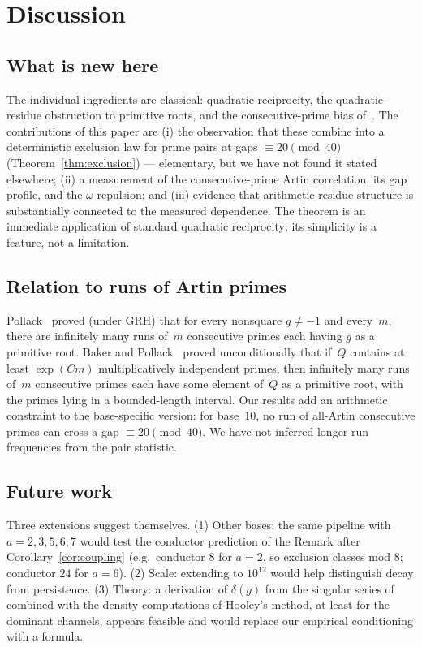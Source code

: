\documentclass[11pt]{amsart}
\theoremstyle{definition}
\begin{document}
\section{Discussion}
\label{sec:discussion}

\subsection*{What is new here}
The individual ingredients are classical: quadratic reciprocity, the
quadratic-residue obstruction to primitive roots, and the consecutive-prime bias
of~\cite{LOS2016}. The contributions of this paper are (i) the observation
that these combine into a deterministic exclusion law for prime pairs at gaps
$\equiv 20 \pmod{40}$ (Theorem~\ref{thm:exclusion}) --- elementary, but we have
not found it stated elsewhere; (ii) a measurement of the
consecutive-prime Artin correlation, its gap profile, and the $\omega$
repulsion; and (iii) evidence that arithmetic residue structure is substantially
connected to the measured dependence. The theorem is an immediate
application of standard quadratic reciprocity; its simplicity is a feature,
not a limitation.

\subsection*{Relation to runs of Artin primes}
Pollack~\cite{Pollack2014} proved (under GRH) that for every nonsquare
$g \neq -1$ and every~$m$, there are infinitely many runs of~$m$ consecutive
primes each having $g$ as a primitive root. Baker and
Pollack~\cite{BakerPollack2016} proved unconditionally that if~$Q$ contains
at least $\exp(Cm)$ multiplicatively independent primes, then infinitely many
runs of~$m$ consecutive primes each have some element of~$Q$ as a primitive
root, with the primes lying in a bounded-length interval.
Our results add an arithmetic constraint to the base-specific version:
for base~$10$, no run of all-Artin consecutive primes can cross a gap
$\equiv 20 \pmod{40}$. We have not inferred longer-run frequencies from the
pair statistic.

\subsection*{Future work}
Three extensions suggest themselves. (1) Other bases: the same pipeline with
$a = 2, 3, 5, 6, 7$ would test the conductor prediction of the Remark after
Corollary~\ref{cor:coupling} (e.g.\ conductor $8$ for $a = 2$, so exclusion
classes mod $8$; conductor $24$ for $a = 6$). (2) Scale: extending to
$10^{12}$ would help distinguish decay from persistence. (3) Theory: a
derivation of $\delta(g)$ from the singular series of~\cite{HardyLittlewood1923}
combined with the density computations of Hooley's method, at least for the
dominant channels, appears feasible and would replace our empirical
conditioning with a formula.
\end{document}
